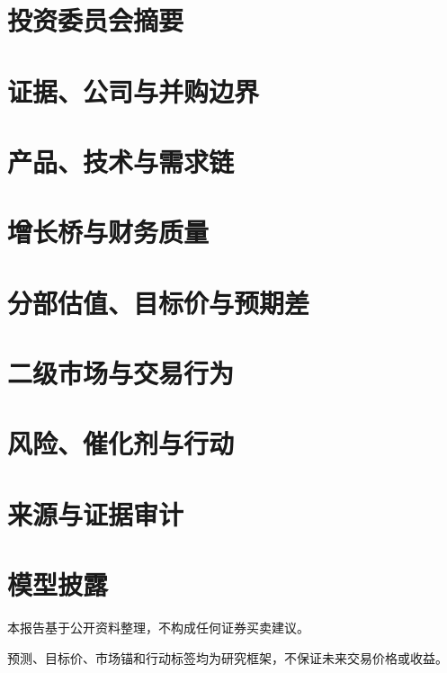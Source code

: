 \documentclass[a4paper,11pt,openany,fontset=none]{ctexrep}
\newcommand{\reportdisclaimer}{本报告基于公开资料整理，不构成任何证券买卖建议。}
\begin{document}
\astockcover
\tableofcontents
\clearpage
\chapter{投资委员会摘要}

\chapter{证据、公司与并购边界}

\chapter{产品、技术与需求链}

\chapter{增长桥与财务质量}

\chapter{分部估值、目标价与预期差}

\chapter{二级市场与交易行为}

\chapter{风险、催化剂与行动}

\appendix
\chapter{来源与证据审计}

\chapter{模型披露}

\clearpage
\thispagestyle{empty}
\vspace*{4cm}
\begin{disclosurebox}[免责声明]
\small
\reportdisclaimer\par
预测、目标价、市场锚和行动标签均为研究框架，不保证未来交易价格或收益。
\end{disclosurebox}
\end{document}
